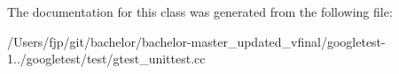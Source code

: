 The documentation for this class was generated from the following file\+:\begin{DoxyCompactItemize}
\item 
/\+Users/fjp/git/bachelor/bachelor-\/master\+\_\+updated\+\_\+vfinal/googletest-\/1../googletest/test/gtest\+\_\+unittest.\+cc\end{DoxyCompactItemize}
